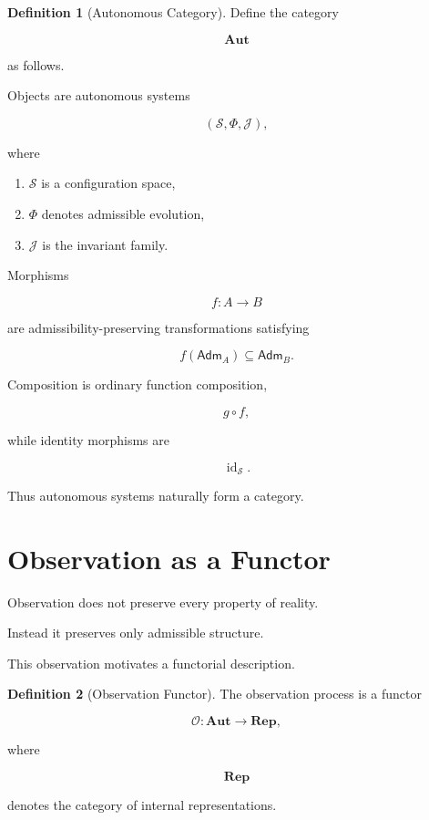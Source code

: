 \documentclass[11pt,oneside]{book}
\numberwithin{equation}{chapter}
\theoremstyle{definition}
\newtheorem{definition}{Definition}[chapter]
\theoremstyle{plain}
\begin{document}
\begin{definition}[Autonomous Category]

Define the category

\[
\mathbf{Aut}
\]

as follows.

Objects are autonomous systems

\[
(\mathcal{S},\Phi,\mathcal{J}),
\]

where

\begin{enumerate}
\item $\mathcal{S}$ is a configuration space,
\item $\Phi$ denotes admissible evolution,
\item $\mathcal{J}$ is the invariant family.
\end{enumerate}

Morphisms

\[
f:A\rightarrow B
\]

are admissibility-preserving transformations satisfying

\[
f(\mathsf{Adm}_A)
\subseteq
\mathsf{Adm}_B.
\]

\end{definition}

Composition is ordinary function composition,

\[
g\circ f,
\]

while identity morphisms are

\[
\operatorname{id}_{\mathcal S}.
\]

Thus autonomous systems naturally form a category.

\section{Observation as a Functor}

Observation does not preserve every property of reality.

Instead it preserves only admissible structure.

This observation motivates a functorial description.

\begin{definition}[Observation Functor]

The observation process is a functor

\[
\mathcal{O}
:
\mathbf{Aut}
\longrightarrow
\mathbf{Rep},
\]

where

\[
\mathbf{Rep}
\]

denotes the category of internal representations.

\end{definition}
\end{document}
